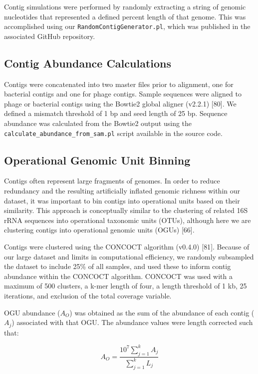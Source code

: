 \documentclass[12pt,]{article}
\begin{document}
Contig simulations were performed by randomly extracting a string of
genomic nucleotides that represented a defined percent length of that
genome. This was accomplished using our
\texttt{RandomContigGenerator.pl}, which was published in the associated
GitHub repository.

\subsection{Contig Abundance
Calculations}\label{contig-abundance-calculations}

Contigs were concatenated into two master files prior to alignment, one
for bacterial contigs and one for phage contigs. Sample sequences were
aligned to phage or bacterial contigs using the Bowtie2 global aligner
(v2.2.1) {[}80{]}. We defined a mismatch threshold of 1 bp and seed
length of 25 bp. Sequence abundance was calculated from the Bowtie2
output using the \texttt{calculate\_abundance\_from\_sam.pl} script
available in the source code.

\subsection{Operational Genomic Unit
Binning}\label{operational-genomic-unit-binning}

Contigs often represent large fragments of genomes. In order to reduce
redundancy and the resulting artificially inflated genomic richness
within our dataset, it was important to bin contigs into operational
units based on their similarity. This approach is conceptually similar
to the clustering of related 16S rRNA sequences into operational
taxonomic units (OTUs), although here we are clustering contigs into
operational genomic units (OGUs) {[}66{]}.

Contigs were clustered using the CONCOCT algorithm (v0.4.0) {[}81{]}.
Because of our large dataset and limits in computational efficiency, we
randomly subsampled the dataset to include 25\% of all samples, and used
these to inform contig abundance within the CONCOCT algorithm. CONCOCT
was used with a maximum of 500 clusters, a k-mer length of four, a
length threshold of 1 kb, 25 iterations, and exclusion of the total
coverage variable.

OGU abundance (\(A_{O}\)) was obtained as the sum of the abundance of
each contig (\(A_{j}\)) associated with that OGU. The abundance values
were length corrected such that:

\[ { A }_{ O }=\frac { { 10 }^{ 7 }\sum _{ j=1 }^{ k }{ { A }_{ j } }  }{ \sum _{ j=1 }^{ k }{ { L }_{ j } }  } \]
\end{document}
